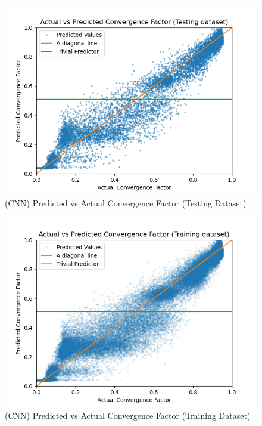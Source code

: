 \begin{figure}[h]
  \centering
  \includegraphics[scale=0.7]{figures/recircflow/conv_test_pred.png}
  \caption{(CNN) Predicted vs Actual Convergence Factor (Testing Dataset)}
  \label{fig:test}
\end{figure}

\begin{figure}[h]
  \centering
  \includegraphics[scale=0.7]{figures/recircflow/conv_train_pred.png}
  \caption{(CNN) Predicted vs Actual Convergence Factor (Training Dataset)}
  \label{fig:train}
\end{figure}


